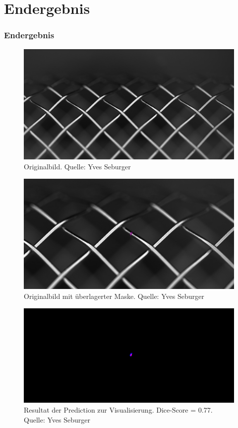 \documentclass{beamer}
\begin{document}
\section{Endergebnis}
\begin{frame}[allowframebreaks]
\frametitle{Endergebnis}
    \begin{figure}
        \includegraphics[width=0.9\linewidth]{Bilder/Original.jpeg}
        \caption{Originalbild. \scriptsize{Quelle: Yves Seburger}}
    \end{figure}
    \begin{figure}
        \includegraphics[width=0.95\linewidth]{Bilder/Original_und_Maske.jpeg}
        \caption{Originalbild mit überlagerter Maske. \scriptsize{Quelle: Yves Seburger}}
    \end{figure}
    \begin{figure}
        \includegraphics[width=0.95\linewidth]{Bilder/Prediction_und_Maske.jpeg}
        \caption{Resultat der Prediction zur Visualisierung. \newline Dice-Score = \raisebox{0.5ex}{\texttildelow}0.77. \scriptsize{Quelle: Yves Seburger}}
    \end{figure}
\end{frame}
\end{document}
